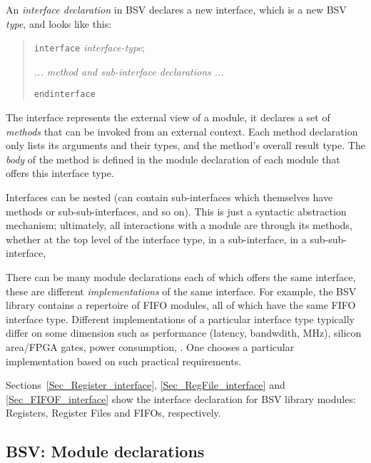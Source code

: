 An \emph{interface declaration} in BSV declares a new interface, which
is a new BSV \emph{type}, and looks like this:

\begin{quote}
{\tt interface} \emph{interface-type};

\hmm \emph{... method and sub-interface declarations ...}

{\tt endinterface}
\end{quote}

The interface represents the external view of a module, {\ie} it
declares a set of \emph{methods} that can be invoked from an external
context.  Each method declaration only lists its arguments and their
types, and the method's overall result type.  The \emph{body} of the
method is defined in the module declaration of each module that offers
this interface type.

Interfaces can be nested (can contain sub-interfaces which themselves
have methods or sub-sub-interfaces, and so on).  This is just a
syntactic abstraction mechanism; ultimately, all interactions with a
module are through its methods, whether at the top level of the
interface type, in a sub-interface, in a sub-sub-interface, {\etc}

There can be many module declarations each of which offers the same
interface, {\ie} these are different \emph{implementations} of the
same interface.  For example, the BSV library contains a repertoire of
FIFO modules, all of which have the same FIFO interface type.
Different implementations of a particular interface type typically
differ on some dimension such as performance (latency, bandwdith,
MHz), silicon area/FPGA gates, power consumption, {\etc}.  One chooses
a particular implementation based on such practical requirements.

Sections~\ref{Sec_Register_interface}, \ref{Sec_RegFile_interface} and
\ref{Sec_FIFOF_interface} show the interface declaration for BSV
library modules: Registers, Register Files and FIFOs, respectively.


\subsection{BSV: Module declarations}

\label{Sec_Module_Decls}


